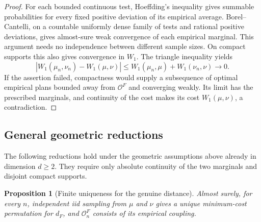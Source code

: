 \documentclass[11pt,reqno]{amsart}
\newtheorem{proposition}[theorem]{Proposition}
\theoremstyle{definition}
\theoremstyle{remark}
\numberwithin{equation}{section}
\begin{document}
\begin{proof}
For each bounded continuous test, Hoeffding's inequality gives
summable probabilities for every fixed positive deviation of its
empirical average. Borel--Cantelli, on a countable uniformly dense
family of tests and rational positive deviations, gives almost-sure
weak convergence of each empirical marginal. This argument needs
no independence between different sample sizes.
On compact supports this also gives convergence in \(W_1\). The
triangle inequality yields
\[
|W_1(\mu_n,\nu_n)-W_1(\mu,\nu)|
\le W_1(\mu_n,\mu)+W_1(\nu_n,\nu)\longrightarrow0.
\]
If the assertion failed, compactness would supply a subsequence of
optimal empirical plans bounded away from \(\mathcal O^F\) and
converging weakly. Its limit has the prescribed marginals, and
continuity of the cost makes its cost \(W_1(\mu,\nu)\), a
contradiction.
\end{proof}

\subsection{General geometric reductions}
\label{subsec:general-geometric-reductions}

The following reductions hold under the geometric assumptions above
already in dimension \(d\ge2\). They require only absolute continuity
of the two marginals and disjoint compact supports.

\begin{proposition}[Finite uniqueness for the genuine distance]
\label{prop:general-finite-uniqueness}
Almost surely, for every \(n\), independent iid sampling from
\(\mu\) and \(\nu\) gives a unique minimum-cost permutation for
\(d_F\), and \(\mathcal O_n^F\) consists of its empirical coupling.
\end{proposition}
\end{document}
